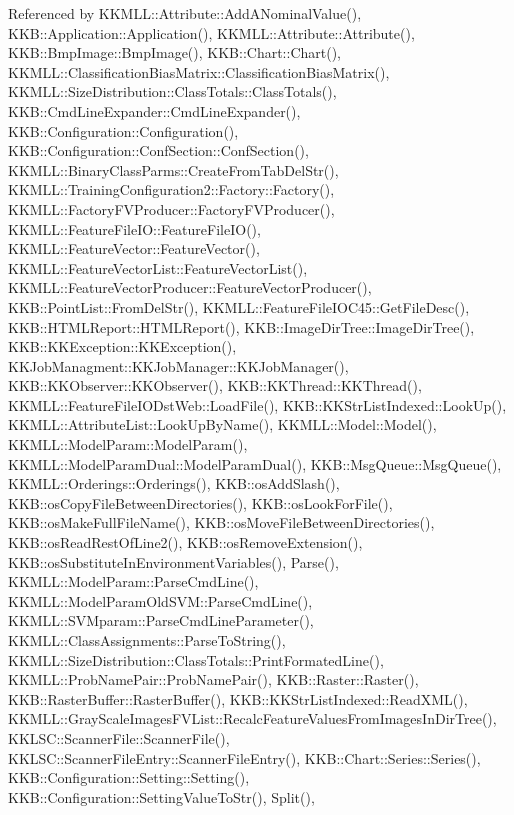 Referenced by K\+K\+M\+L\+L\+::\+Attribute\+::\+Add\+A\+Nominal\+Value(), K\+K\+B\+::\+Application\+::\+Application(), K\+K\+M\+L\+L\+::\+Attribute\+::\+Attribute(), K\+K\+B\+::\+Bmp\+Image\+::\+Bmp\+Image(), K\+K\+B\+::\+Chart\+::\+Chart(), K\+K\+M\+L\+L\+::\+Classification\+Bias\+Matrix\+::\+Classification\+Bias\+Matrix(), K\+K\+M\+L\+L\+::\+Size\+Distribution\+::\+Class\+Totals\+::\+Class\+Totals(), K\+K\+B\+::\+Cmd\+Line\+Expander\+::\+Cmd\+Line\+Expander(), K\+K\+B\+::\+Configuration\+::\+Configuration(), K\+K\+B\+::\+Configuration\+::\+Conf\+Section\+::\+Conf\+Section(), K\+K\+M\+L\+L\+::\+Binary\+Class\+Parms\+::\+Create\+From\+Tab\+Del\+Str(), K\+K\+M\+L\+L\+::\+Training\+Configuration2\+::\+Factory\+::\+Factory(), K\+K\+M\+L\+L\+::\+Factory\+F\+V\+Producer\+::\+Factory\+F\+V\+Producer(), K\+K\+M\+L\+L\+::\+Feature\+File\+I\+O\+::\+Feature\+File\+I\+O(), K\+K\+M\+L\+L\+::\+Feature\+Vector\+::\+Feature\+Vector(), K\+K\+M\+L\+L\+::\+Feature\+Vector\+List\+::\+Feature\+Vector\+List(), K\+K\+M\+L\+L\+::\+Feature\+Vector\+Producer\+::\+Feature\+Vector\+Producer(), K\+K\+B\+::\+Point\+List\+::\+From\+Del\+Str(), K\+K\+M\+L\+L\+::\+Feature\+File\+I\+O\+C45\+::\+Get\+File\+Desc(), K\+K\+B\+::\+H\+T\+M\+L\+Report\+::\+H\+T\+M\+L\+Report(), K\+K\+B\+::\+Image\+Dir\+Tree\+::\+Image\+Dir\+Tree(), K\+K\+B\+::\+K\+K\+Exception\+::\+K\+K\+Exception(), K\+K\+Job\+Managment\+::\+K\+K\+Job\+Manager\+::\+K\+K\+Job\+Manager(), K\+K\+B\+::\+K\+K\+Observer\+::\+K\+K\+Observer(), K\+K\+B\+::\+K\+K\+Thread\+::\+K\+K\+Thread(), K\+K\+M\+L\+L\+::\+Feature\+File\+I\+O\+Dst\+Web\+::\+Load\+File(), K\+K\+B\+::\+K\+K\+Str\+List\+Indexed\+::\+Look\+Up(), K\+K\+M\+L\+L\+::\+Attribute\+List\+::\+Look\+Up\+By\+Name(), K\+K\+M\+L\+L\+::\+Model\+::\+Model(), K\+K\+M\+L\+L\+::\+Model\+Param\+::\+Model\+Param(), K\+K\+M\+L\+L\+::\+Model\+Param\+Dual\+::\+Model\+Param\+Dual(), K\+K\+B\+::\+Msg\+Queue\+::\+Msg\+Queue(), K\+K\+M\+L\+L\+::\+Orderings\+::\+Orderings(), K\+K\+B\+::os\+Add\+Slash(), K\+K\+B\+::os\+Copy\+File\+Between\+Directories(), K\+K\+B\+::os\+Look\+For\+File(), K\+K\+B\+::os\+Make\+Full\+File\+Name(), K\+K\+B\+::os\+Move\+File\+Between\+Directories(), K\+K\+B\+::os\+Read\+Rest\+Of\+Line2(), K\+K\+B\+::os\+Remove\+Extension(), K\+K\+B\+::os\+Substitute\+In\+Environment\+Variables(), Parse(), K\+K\+M\+L\+L\+::\+Model\+Param\+::\+Parse\+Cmd\+Line(), K\+K\+M\+L\+L\+::\+Model\+Param\+Old\+S\+V\+M\+::\+Parse\+Cmd\+Line(), K\+K\+M\+L\+L\+::\+S\+V\+Mparam\+::\+Parse\+Cmd\+Line\+Parameter(), K\+K\+M\+L\+L\+::\+Class\+Assignments\+::\+Parse\+To\+String(), K\+K\+M\+L\+L\+::\+Size\+Distribution\+::\+Class\+Totals\+::\+Print\+Formated\+Line(), K\+K\+M\+L\+L\+::\+Prob\+Name\+Pair\+::\+Prob\+Name\+Pair(), K\+K\+B\+::\+Raster\+::\+Raster(), K\+K\+B\+::\+Raster\+Buffer\+::\+Raster\+Buffer(), K\+K\+B\+::\+K\+K\+Str\+List\+Indexed\+::\+Read\+X\+M\+L(), K\+K\+M\+L\+L\+::\+Gray\+Scale\+Images\+F\+V\+List\+::\+Recalc\+Feature\+Values\+From\+Images\+In\+Dir\+Tree(), K\+K\+L\+S\+C\+::\+Scanner\+File\+::\+Scanner\+File(), K\+K\+L\+S\+C\+::\+Scanner\+File\+Entry\+::\+Scanner\+File\+Entry(), K\+K\+B\+::\+Chart\+::\+Series\+::\+Series(), K\+K\+B\+::\+Configuration\+::\+Setting\+::\+Setting(), K\+K\+B\+::\+Configuration\+::\+Setting\+Value\+To\+Str(), Split(), 